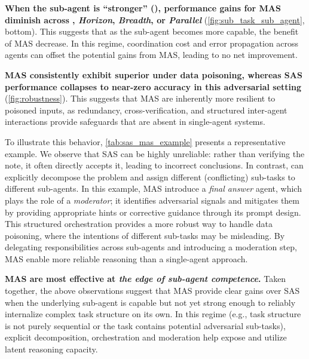 \textbf{When the sub-agent is ``stronger'' (\ossonetwentylow), performance gains for MAS diminish across \depth, \textit{Horizon}, \textit{Breadth}, or \textit{Parallel}} (\cref{fig:sub_task_sub_agent}, bottom). This suggests that as the sub-agent becomes more capable, the benefit of MAS decrease. In this regime, coordination cost and error propagation across agents can offset the potential gains from MAS, leading to no net improvement.


\textbf{MAS consistently exhibit superior \robustness under data poisoning, whereas SAS performance collapses to near-zero accuracy in this adversarial setting
}  (\cref{fig:robustness}).
This suggests that MAS are inherently more resilient to poisoned inputs, as redundancy, cross-verification, and structured inter-agent interactions provide safeguards that are absent in single-agent systems. 

To illustrate this behavior, \cref{tab:sas_mas_example} presents a representative example.
We observe that SAS can be highly
unreliable: rather than verifying the note, it often directly
accepts it, leading to incorrect conclusions. In contrast, \ourframework can explicitly decompose the problem and assign different (conflicting)
sub-tasks to different sub-agents. In this example, MAS introduce a \emph{final
answer} agent, which plays the role of a \emph{moderator}; it
identifies adversarial signals and mitigates them by providing appropriate hints or corrective guidance through its prompt design. This structured orchestration provides a more robust way to handle data poisoning, where the intentions of different sub-tasks may be misleading. By delegating responsibilities across sub-agents and introducing a moderation step, MAS enable more reliable reasoning than a single-agent
approach.

\textbf{MAS are most effective at \textit{the edge of sub-agent competence}.} Taken together, the above observations suggest that MAS provide clear gains over SAS when the underlying
sub-agent is capable but not yet strong enough to reliably internalize complex
task structure on its own. In this regime (e.g., task structure is not
purely sequential or the task contains potential adversarial sub-tasks), explicit decomposition, 
orchestration and moderation help expose and utilize latent reasoning capacity. 


